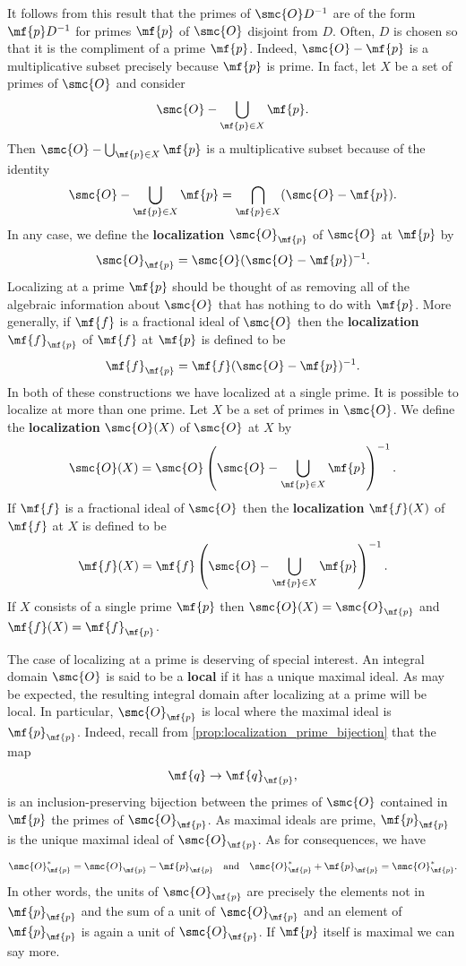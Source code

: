     It follows from this result that the primes of \(\smc{O}D^{-1}\) are of the form \(\mf{p}D^{-1}\) for primes \(\mf{p}\) of \(\smc{O}\) disjoint from \(D\). Often, \(D\) is chosen so that it is the compliment of a prime \(\mf{p}\). Indeed, \(\smc{O}-\mf{p}\) is a multiplicative subset precisely because \(\mf{p}\) is prime. In fact, let \(X\) be a set of primes of \(\smc{O}\) and consider
    \[
      \smc{O}-\bigcup_{\mf{p} \in X}\mf{p}.
    \]
    Then \(\smc{O}-\bigcup_{\mf{p} \in X}\mf{p}\) is a multiplicative subset because of the identity
    \[
      \smc{O}-\bigcup_{\mf{p} \in X}\mf{p} = \bigcap_{\mf{p} \in X}(\smc{O}-\mf{p}).
    \]
    In any case, we define the \textbf{localization} \(\smc{O}_{\mf{p}}\) of \(\smc{O}\) at \(\mf{p}\) by
    \[
      \smc{O}_{\mf{p}} = \smc{O}(\smc{O}-\mf{p})^{-1}.
    \]
    Localizing at a prime \(\mf{p}\) should be thought of as removing all of the algebraic information about \(\smc{O}\) that has nothing to do with \(\mf{p}\). More generally, if \(\mf{f}\) is a fractional ideal of \(\smc{O}\) then the \textbf{localization} \(\mf{f}_{\mf{p}}\) of \(\mf{f}\) at \(\mf{p}\) is defined to be
    \[
      \mf{f}_{\mf{p}} = \mf{f}(\smc{O}-\mf{p})^{-1}.
    \]
    In both of these constructions we have localized at a single prime. It is possible to localize at more than one prime. Let \(X\) be a set of primes in \(\smc{O}\). We define the \textbf{localization} \(\smc{O}(X)\) of \(\smc{O}\) at \(X\) by
    \[
      \smc{O}(X) = \smc{O}\left(\smc{O}-\bigcup_{\mf{p} \in X}\mf{p}\right)^{-1}.
    \]
    If \(\mf{f}\) is a fractional ideal of \(\smc{O}\) then the \textbf{localization} \(\mf{f}(X)\) of \(\mf{f}\) at \(X\) is defined to be
    \[
      \mf{f}(X) = \mf{f}\left(\smc{O}-\bigcup_{\mf{p} \in X}\mf{p}\right)^{-1}.
    \]
    If \(X\) consists of a single prime \(\mf{p}\) then \(\smc{O}(X) = \smc{O}_{\mf{p}}\) and \(\mf{f}(X) = \mf{f}_{\mf{p}}\).

    The case of localizing at a prime is deserving of special interest. An integral domain \(\smc{O}\) is said to be a \textbf{local} if it has a unique maximal ideal. As may be expected, the resulting integral domain after localizing at a prime will be local. In particular, \(\smc{O}_{\mf{p}}\) is local where the maximal ideal is \(\mf{p}_{\mf{p}}\). Indeed, recall from \cref{prop:localization_prime_bijection} that the map
    \[
      \mf{q} \to \mf{q}_{\mf{p}},
    \]
    is an inclusion-preserving bijection between the primes of \(\smc{O}\) contained in \(\mf{p}\) the primes of \(\smc{O}_{\mf{p}}\). As maximal ideals are prime, \(\mf{p}_{\mf{p}}\) is the unique maximal ideal of \(\smc{O}_{\mf{p}}\). As for consequences, we have
    \[
      \smc{O}_{\mf{p}}^{\ast} = \smc{O}_{\mf{p}}-\mf{p}_{\mf{p}} \quad \text{and} \quad \smc{O}_{\mf{p}}^{\ast}+\mf{p}_{\mf{p}} = \smc{O}_{\mf{p}}^{\ast}.
    \]
    In other words, the units of \(\smc{O}_{\mf{p}}\) are precisely the elements not in \(\mf{p}_{\mf{p}}\) and the sum of a unit of \(\smc{O}_{\mf{p}}\) and an element of \(\mf{p}_{\mf{p}}\) is again a unit of \(\smc{O}_{\mf{p}}\). If \(\mf{p}\) itself is maximal we can say more.

